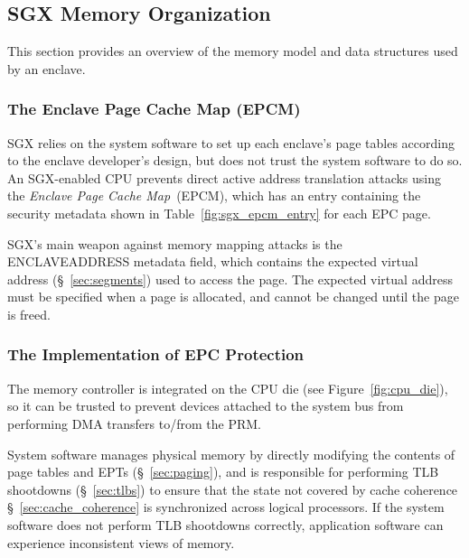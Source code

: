 \subsection{SGX Memory Organization}
\label{sec:memory}

This section provides an overview of the memory model and  data structures used
by an enclave.




\subsubsection{The Enclave Page Cache Map (EPCM)}


SGX relies on the system software to set up each enclave's page tables
according to the enclave developer's design, but does not trust the system
software to do so. An SGX-enabled CPU prevents direct active address
translation attacks using the \textit{Enclave Page Cache Map}~(EPCM), which has
an entry containing the security metadata shown in
Table~\ref{fig:sgx_epcm_entry}
for each EPC page.




SGX's main weapon against memory mapping attacks is the ENCLAVEADDRESS metadata
field, which contains the expected virtual address (\S~\ref{sec:segments}) used
to access the page. The expected virtual address must be specified when a page
is allocated, and cannot be changed until the page is freed.



\subsubsection{The Implementation of EPC Protection}

The memory controller is
integrated on the CPU die (see Figure~\ref{fig:cpu_die}), so it can be trusted
to prevent devices attached to the system bus from performing DMA transfers
to/from the PRM.

System software manages physical memory by directly modifying the contents of
page tables and EPTs (\S~\ref{sec:paging}), and is responsible for performing
TLB shootdowns (\S~\ref{sec:tlbs}) to ensure that the state not covered by
cache coherence \S~\ref{sec:cache_coherence} is synchronized across logical
processors. If the system software does not perform TLB shootdowns correctly,
application software can experience inconsistent views of memory.


